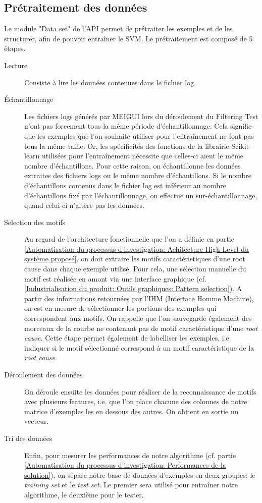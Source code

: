 \subsection{Prétraitement des données}
\label{Industrialisation du produit: API: Pré-traitement et traitement des données}
Le module "Data set" de l'API permet de prétraiter les exemples et de les structurer, afin de pouvoir entraîner le SVM. 
Le prétraitement est composé de 5 étapes.
\begin{description}
	\item [Lecture] Consiste à lire les données contenues dans le fichier log. 
	\item [Échantillonnage] Les fichiers logs générés par MEIGUI lors du déroulement du Filtering Test n'ont pas forcement tous la même période d'échantillonnage. Cela signifie que les exemples que l'on souhaite utiliser pour l'entraînement ne font pas tous la même taille. Or, les spécificités des fonctions de la librairie Scikit-learn utilisées pour l'entraînement nécessite que celles-ci aient le même nombre d'échantillons. Pour cette raison, on échantillonne les données extraites des fichiers logs ou le même nombre d'échantillons. Si le nombre d'échantillons contenus dans le fichier log est inférieur au nombre d'échantillons fixé par l'échantillonnage, on effectue un sur-échantillonnage, quand celui-ci n'altère pas les données. 
	\item [Selection des motifs] Au regard de l'architecture fonctionnelle que l'on a définie en partie \ref{Automatisation du processus d'investigation: Achitecture High Level du système proposé}, on doit extraire les motifs caractéristiques d'une root cause dans chaque exemple utilisé. Pour cela, une sélection manuelle du motif est réalisée en amont via une interface graphique (cf. \ref{Industrialisation du produit: Outils graphiques: Pattern selection}). A partir des informations retournées par l'IHM (Interface Homme Machine), on est en mesure de sélectionner les portions des exemples qui correspondent aux motifs. On rappelle que l'on sauvegarde également des morceaux de la courbe ne contenant pas de motif caractéristique d'une \emph{root cause}. Cette étape permet également de labelliser les exemples, i.e. indiquer si le motif sélectionné correspond à un motif caractéristique de la \emph{root cause}.
	\item [Déroulement des données] On déroule ensuite les données pour réaliser de la reconnaissance de motifs avec plusieurs features, i.e. que l'on place chacune des colonnes de notre matrice d'exemples les en dessous des autres. On obtient en sortie un vecteur. 
	\item [Tri des données] Enfin, pour mesurer les performances de notre algorithme (cf. partie \ref{Automatisation du processus d'investigation: Performances de la solution}), on sépare notre base de données d'exemples en deux groupes: le \emph{training set} et le \emph{test set}. Le premier sera utilisé pour entraîner notre algorithme, le deuxième pour le tester. 
\end{description}


